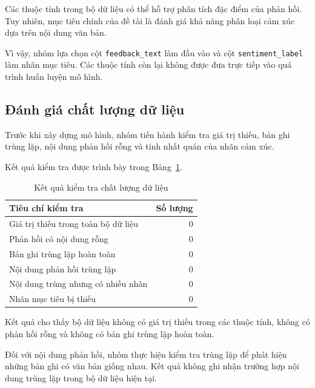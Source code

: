 Các thuộc tính trong bộ dữ liệu có thể hỗ trợ phân tích đặc điểm của phản hồi. Tuy nhiên, mục tiêu chính của đề tài là đánh giá khả năng phân loại cảm xúc dựa trên nội dung văn bản.

Vì vậy, nhóm lựa chọn cột \texttt{feedback\_text} làm đầu vào và cột \texttt{sentiment\_label} làm nhãn mục tiêu. Các thuộc tính còn lại không được đưa trực tiếp vào quá trình huấn luyện mô hình.



\subsection{Đánh giá chất lượng dữ liệu}

Trước khi xây dựng mô hình, nhóm tiến hành kiểm tra giá trị thiếu, bản ghi trùng lặp, nội dung phản hồi rỗng và tính nhất quán của nhãn cảm xúc.

Kết quả kiểm tra được trình bày trong Bảng~\ref{tab:chat-luong-du-lieu}.

\begin{table}[H]
    \centering
    \caption{Kết quả kiểm tra chất lượng dữ liệu}
    \label{tab:chat-luong-du-lieu}
    \renewcommand{\arraystretch}{1.15}

    \begin{tabularx}{\textwidth}{|X|r|}
        \hline
        \textbf{Tiêu chí kiểm tra}
        & \textbf{Số lượng} \\
        \hline
        Giá trị thiếu trong toàn bộ dữ liệu & 0 \\
        \hline
        Phản hồi có nội dung rỗng & 0 \\
        \hline
        Bản ghi trùng lặp hoàn toàn & 0 \\
        \hline
        Nội dung phản hồi trùng lặp & 0 \\
        \hline
        Nội dung trùng nhưng có nhiều nhãn & 0 \\
        \hline
        Nhãn mục tiêu bị thiếu & 0 \\
        \hline
    \end{tabularx}
\end{table}

Kết quả cho thấy bộ dữ liệu không có giá trị thiếu trong các thuộc tính, không có phản hồi rỗng và không có bản ghi trùng lặp hoàn toàn.

Đối với nội dung phản hồi, nhóm thực hiện kiểm tra trùng lặp để phát hiện những bản ghi có văn bản giống nhau. Kết quả không ghi nhận trường hợp nội dung trùng lặp trong bộ dữ liệu hiện tại.

